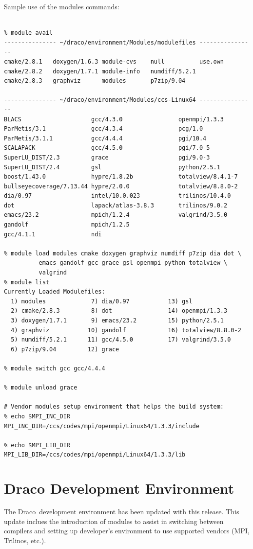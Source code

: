 \documentclass[note]{ResearchNote}
\newcommand{\draco}{Draco}
\begin{document}
Sample use of the modules commands:
\begin{lstlisting}[basicstyle=\footnotesize, xleftmargin=0.5in, 
  xrightmargin=0.5in]
% module clear 

% module avail
--------------- ~/draco/environment/Modules/modulefiles ----------------
cmake/2.8.1   doxygen/1.6.3 module-cvs    null          use.own
cmake/2.8.2   doxygen/1.7.1 module-info   numdiff/5.2.1
cmake/2.8.3   graphviz      modules       p7zip/9.04

--------------- ~/draco/environment/Modules/ccs-Linux64 ----------------
BLACS                    gcc/4.3.0                openmpi/1.3.3
ParMetis/3.1             gcc/4.3.4                pcg/1.0
ParMetis/3.1.1           gcc/4.4.4                pgi/10.4
SCALAPACK                gcc/4.5.0                pgi/7.0-5
SuperLU_DIST/2.3         grace                    pgi/9.0-3
SuperLU_DIST/2.4         gsl                      python/2.5.1
boost/1.43.0             hypre/1.8.2b             totalview/8.4.1-7
bullseyecoverage/7.13.44 hypre/2.0.0              totalview/8.8.0-2
dia/0.97                 intel/10.0.023           trilinos/10.4.0
dot                      lapack/atlas-3.8.3       trilinos/9.0.2
emacs/23.2               mpich/1.2.4              valgrind/3.5.0
gandolf                  mpich/1.2.5
gcc/4.1.1                ndi

% module load modules cmake doxygen graphviz numdiff p7zip dia dot \
          emacs gandolf gcc grace gsl openmpi python totalview \
          valgrind
% module list
Currently Loaded Modulefiles:
  1) modules             7) dia/0.97           13) gsl
  2) cmake/2.8.3         8) dot                14) openmpi/1.3.3
  3) doxygen/1.7.1       9) emacs/23.2         15) python/2.5.1
  4) graphviz           10) gandolf            16) totalview/8.8.0-2
  5) numdiff/5.2.1      11) gcc/4.5.0          17) valgrind/3.5.0
  6) p7zip/9.04         12) grace

% module switch gcc gcc/4.4.4

% module unload grace

# Vendor modules setup environment that helps the build system:
% echo $MPI_INC_DIR
MPI_INC_DIR=/ccs/codes/mpi/openmpi/Linux64/1.3.3/include

% echo $MPI_LIB_DIR
MPI_LIB_DIR=/ccs/codes/mpi/openmpi/Linux64/1.3.3/lib
\end{lstlisting}


\section{Draco Development Environment}
The \draco\ development environment has been updated with this
release.  This update inclues the introduction of \textsf{modules} to
assist in switching between compilers and setting up developer's
environment to use supported vendors (MPI, Trilinos, etc.).  
\end{document}
